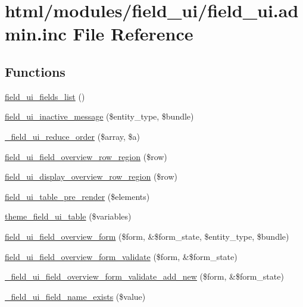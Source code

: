 \hypertarget{field__ui_8admin_8inc}{
\section{html/modules/field\_\-ui/field\_\-ui.admin.inc File Reference}
\label{field__ui_8admin_8inc}
}
\subsection*{Functions}
\begin{DoxyCompactItemize}
\item 
\hyperlink{field__ui_8admin_8inc_a5e0e40fc338f93f08e74a304bada0df6}{field\_\-ui\_\-fields\_\-list} ()
\item 
\hyperlink{field__ui_8admin_8inc_a61dfac68260a4115c338ff7c0432c64c}{field\_\-ui\_\-inactive\_\-message} (\$entity\_\-type, \$bundle)
\item 
\hyperlink{field__ui_8admin_8inc_ae35d5b4422a3682ca5f8f5251dbde04d}{\_\-field\_\-ui\_\-reduce\_\-order} (\$array, \$a)
\item 
\hyperlink{field__ui_8admin_8inc_a1dc95804d73e042f77a0d2886f610d9b}{field\_\-ui\_\-field\_\-overview\_\-row\_\-region} (\$row)
\item 
\hyperlink{field__ui_8admin_8inc_aac22d6a68a6fbdf179fc260770c11ce3}{field\_\-ui\_\-display\_\-overview\_\-row\_\-region} (\$row)
\item 
\hyperlink{field__ui_8admin_8inc_a3aaaf5a32e48e5cebdae7abb960fb0fc}{field\_\-ui\_\-table\_\-pre\_\-render} (\$elements)
\item 
\hyperlink{group__themeable_gae4055bc790361b3cb3e6edd36712243d}{theme\_\-field\_\-ui\_\-table} (\$variables)
\item 
\hyperlink{group__forms_gad62638f853fe251696eb3b57e8111845}{field\_\-ui\_\-field\_\-overview\_\-form} (\$form, \&\$form\_\-state, \$entity\_\-type, \$bundle)
\item 
\hyperlink{field__ui_8admin_8inc_a1e5fb5a6f69ee3f155c3b433ad78ba1e}{field\_\-ui\_\-field\_\-overview\_\-form\_\-validate} (\$form, \&\$form\_\-state)
\item 
\hyperlink{field__ui_8admin_8inc_a2b8d7fe2bc8042c2548d0da84a11e068}{\_\-field\_\-ui\_\-field\_\-overview\_\-form\_\-validate\_\-add\_\-new} (\$form, \&\$form\_\-state)
\item 
\hyperlink{field__ui_8admin_8inc_a31767c01b35190d495170c589b88475c}{\_\-field\_\-ui\_\-field\_\-name\_\-exists} (\$value)

\end{DoxyCompactItemize}
